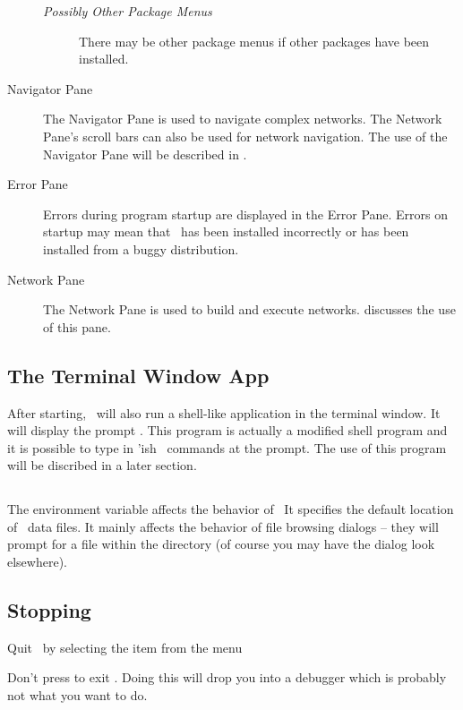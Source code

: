 \begin{description}
  \begin{description}
  \item [\textit{Possibly Other Package Menus}] There may be other package
    menus if other packages have been installed.
  \end{description}

\item[Navigator Pane] The Navigator Pane is used to navigate complex
  networks.  The Network Pane's scroll bars can also be used for network
  navigation.  The use of the Navigator Pane will be described in
  .
  
\item[Error Pane] Errors during program startup are displayed in the Error
  Pane.  Errors on startup may mean that \sr\ has been installed
  incorrectly or has been installed from a buggy distribution.
  
\item[Network Pane] The Network Pane is used to build and execute networks.
   discusses the use of this
  pane.

\end{description}

\subsection{The Terminal Window App}
\label{sec:termwinapp}

After starting, \sr\ will also run a shell-like application in the terminal
window.  It will display the prompt .  This program is
actually a modified  shell program and it
is possible to type in 'ish \sr\ commands at the prompt. The
use of this program will be discribed in a later section.


\subsection{}
\label{sec:scirundata}

The environment variable  affects the behavior of \sr\ 
It specifies the default location of \sr\ data files.  It mainly affects
the behavior of file browsing dialogs -- they will prompt for a file within
the \envvar{SCIRUN\_DATA} directory (of course you may have the dialog look
elsewhere).


\subsection{Stopping}
\label{sec:stopping}

Quit \sr\ by selecting the  item from the  menu

Don't press  to exit \sr.  Doing this will drop you into
a debugger which is probably not what you want to do.


